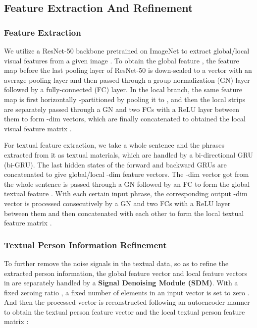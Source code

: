 \documentclass[sigconf]{acmart}
\begin{document}
\subsection{Feature Extraction And Refinement}
\label{sec:feature_extraction}
\subsubsection{Feature Extraction}
We utilize a ResNet-50 \cite{ResNet} backbone pretrained on ImageNet to extract global/local visual features from a given image . To obtain the global feature , the feature map before the last pooling layer of ResNet-50 is down-scaled to a vector  with an average pooling layer and then passed through a group normalization (GN) layer followed by a fully-connected (FC) layer. In the local branch, the same feature map is first horizontally -partitioned by pooling it to , and then the local strips are separately passed through a GN and two FCs with a ReLU layer between them to form  -dim vectors, which are finally concatenated to obtained the local visual feature matrix .

For textual feature extraction, we take a whole sentence and the  phrases extracted from it as textual materials, which are handled by a bi-directional GRU (bi-GRU). The last hidden states of the forward and backward GRUs are concatenated to give global/local -dim feature vectors. The -dim vector got from the whole sentence is passed through a GN followed by an FC to form the global textual feature . With each certain input phrase, the corresponding output -dim vector is processed consecutively by a GN and two FCs with a ReLU layer between them and then concatenated with each other to form the local textual feature matrix .

\subsubsection{Textual Person Information Refinement}
To further remove the noise signals in the textual data, so as to refine the extracted person information, the global feature vector  and local feature vectors in  are separately handled by a \textbf{Signal Denoising Module (SDM)}. With a fixed zeroing ratio , a fixed number of elements in an input vector is set to zero \cite{vincent2008denoisingAE}. And then the processed vector is reconstructed following an autoencoder manner to obtain the textual person feature vector  and the local textual person feature matrix :
\end{document}
